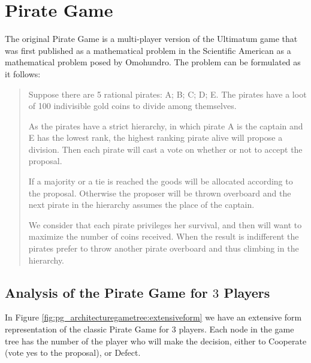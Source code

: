 \documentclass[10pt,twocolumn]{llncs}
\begin{document}
\section{Pirate Game}
\label{sec:pirate_description}

The original Pirate Game is a multi-player version of the Ultimatum game that was first published as a mathematical problem in the Scientific American as a mathematical problem posed by Omohundro\cite{Stewart1999}. The problem can be formulated as it follows:

\begin{quotation}
Suppose there are 5 rational pirates: A; B; C; D; E. The pirates have a  loot of 100 indivisible gold coins to divide among themselves.


As the pirates have a strict hierarchy, in which pirate A is the captain and E has the lowest rank, the highest ranking pirate alive will propose a division. Then each pirate will cast a vote on whether or not to accept the proposal. 

If a majority or a tie is reached the goods will be allocated according to the proposal. Otherwise the proposer will be thrown overboard and the next pirate in the hierarchy assumes the place of the captain. 

We consider that each pirate privileges her survival, and then will want to maximize the number of coins received. When the result is indifferent the pirates prefer to throw another pirate overboard and thus climbing in the hierarchy. 
\end{quotation}

\subsection{Analysis of the Pirate Game for $3$ Players}
\label{subsubsec:analysis_PG3players}

In Figure \ref{fig:pg_architecturegametree:extensiveform} we have an extensive form representation of the classic Pirate Game for $3$ players. Each node in the game tree has the number of the player who will make the decision, either to Cooperate (vote yes to the proposal), or Defect. 
\end{document}
